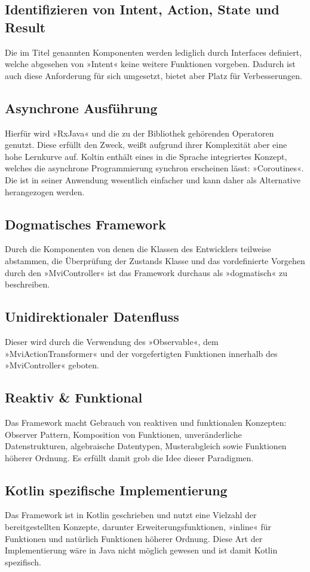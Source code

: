 \subsection{Identifizieren von Intent, Action, State und Result}
Die im Titel genannten Komponenten werden lediglich durch Interfaces definiert, welche abgesehen von »Intent« keine weitere Funktionen vorgeben. Dadurch ist auch diese Anforderung für sich umgesetzt, bietet aber Platz für Verbesserungen.

\subsection{Asynchrone Ausführung}
Hierfür wird »RxJava« und die zu der Bibliothek gehörenden Operatoren genutzt. Diese erfüllt den Zweck, weißt aufgrund ihrer Komplexität aber eine hohe Lernkurve auf. Koltin enthält eines in die Sprache integriertes Konzept, welches die asynchrone Programmierung synchron erscheinen lässt: »Coroutines«.
\cite{kotlinCoroutines}
Die ist in seiner Anwendung wesentlich einfacher und kann daher als Alternative herangezogen werden.

\subsection{Dogmatisches Framework}
Durch die Komponenten von denen die Klassen des Entwicklers teilweise abstammen, die Überprüfung der Zustands Klasse und das vordefinierte Vorgehen durch den »MviController« ist das Framework durchaus als »dogmatisch« zu beschreiben.

\subsection{Unidirektionaler Datenfluss}
Dieser wird durch die Verwendung des »Observable«, dem »MviActionTransformer« und der vorgefertigten Funktionen innerhalb des  »MviController« geboten.

\subsection{Reaktiv \& Funktional}
Das Framework macht Gebrauch von reaktiven und funktionalen Konzepten: Observer Pattern, Komposition von Funktionen, unveränderliche Datenstrukturen, algebraische Datentypen, Musterabgleich sowie Funktionen höherer Ordnung. Es erfüllt damit grob die Idee dieser Paradigmen.

\subsection{Kotlin spezifische Implementierung}
Das Framework ist in Kotlin geschrieben und nutzt eine Vielzahl der bereitgestellten Konzepte, darunter Erweiterungsfunktionen, »inline« für Funktionen und natürlich Funktionen höherer Ordnung. Diese Art der Implementierung wäre in Java nicht möglich gewesen und ist damit Kotlin spezifisch.

